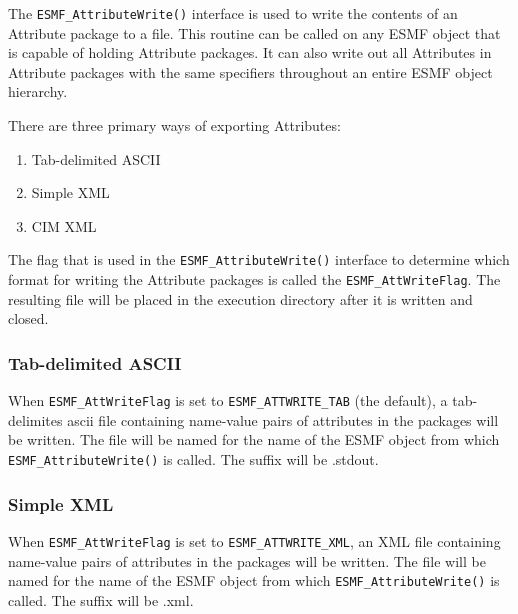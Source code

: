 %

\label{sec:AttributeExports}

The {\tt ESMF\_AttributeWrite()} interface is used to write the contents of an Attribute package to a file.  This routine can be called on any ESMF object that is capable of holding Attribute packages.  It can also write out all Attributes in Attribute packages with the same specifiers throughout an entire ESMF object hierarchy. 

There are three primary ways of exporting Attributes:
\begin{enumerate}
   \item Tab-delimited ASCII
   \item Simple XML 
   \item CIM XML
\end{enumerate}

The flag that is used in the {\tt ESMF\_AttributeWrite()} interface to determine which format for writing the Attribute packages is called the {\tt ESMF\_AttWriteFlag}.  The resulting file will be placed in the execution directory after it is written and closed.

\subsubsection{Tab-delimited ASCII}

When {\tt ESMF\_AttWriteFlag} is set to {\tt ESMF\_ATTWRITE\_TAB} (the default), a tab-delimites ascii file containing name-value pairs of attributes in the packages will be written.  The file will be named for the name of the ESMF object from which {\tt ESMF\_AttributeWrite()} is called. The suffix will be .stdout.


\subsubsection{Simple XML}

When {\tt ESMF\_AttWriteFlag} is set to {\tt ESMF\_ATTWRITE\_XML}, an XML file containing name-value pairs of attributes in the packages will be written.  The file will be named for the name of the ESMF object from which {\tt ESMF\_AttributeWrite()} is called. The suffix will be .xml.

